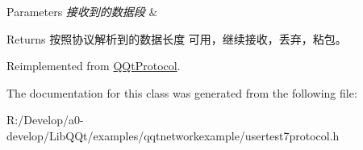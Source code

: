 \begin{DoxyParams}{Parameters}
{\em 接收到的数据段} & \\
\hline
\end{DoxyParams}
\begin{DoxyReturn}{Returns}
按照协议解析到的数据长度 可用，继续接收，丢弃，粘包。 
\end{DoxyReturn}


Reimplemented from \mbox{\hyperlink{class_q_qt_protocol_a00fd0c1ac23379ed3b9b25da9a34f39b}{Q\+Qt\+Protocol}}.



The documentation for this class was generated from the following file\+:\begin{DoxyCompactItemize}
\item 
R\+:/\+Develop/a0-\/develop/\+Lib\+Q\+Qt/examples/qqtnetworkexample/usertest7protocol.\+h\end{DoxyCompactItemize}
